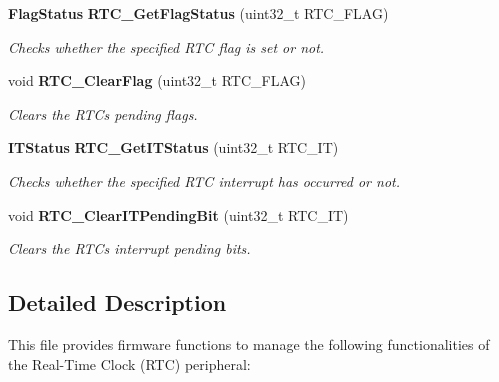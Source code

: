 \begin{DoxyCompactItemize}
\textbf{ Flag\+Status} \textbf{ R\+T\+C\+\_\+\+Get\+Flag\+Status} (uint32\+\_\+t R\+T\+C\+\_\+\+F\+L\+AG)
\begin{DoxyCompactList}\small\item\em Checks whether the specified R\+TC flag is set or not. \end{DoxyCompactList}\item 
void \textbf{ R\+T\+C\+\_\+\+Clear\+Flag} (uint32\+\_\+t R\+T\+C\+\_\+\+F\+L\+AG)
\begin{DoxyCompactList}\small\item\em Clears the R\+TC\textquotesingle{}s pending flags. \end{DoxyCompactList}\item 
\textbf{ I\+T\+Status} \textbf{ R\+T\+C\+\_\+\+Get\+I\+T\+Status} (uint32\+\_\+t R\+T\+C\+\_\+\+IT)
\begin{DoxyCompactList}\small\item\em Checks whether the specified R\+TC interrupt has occurred or not. \end{DoxyCompactList}\item 
void \textbf{ R\+T\+C\+\_\+\+Clear\+I\+T\+Pending\+Bit} (uint32\+\_\+t R\+T\+C\+\_\+\+IT)
\begin{DoxyCompactList}\small\item\em Clears the R\+TC\textquotesingle{}s interrupt pending bits. \end{DoxyCompactList}\end{DoxyCompactItemize}


\subsection{Detailed Description}
This file provides firmware functions to manage the following functionalities of the Real-\/\+Time Clock (R\+TC) peripheral\+: 

